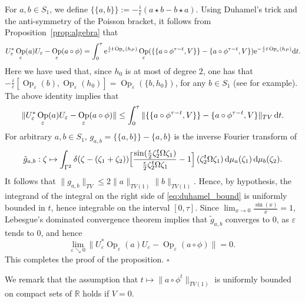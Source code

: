 \documentclass[11pt]{article}
\DeclareMathOperator{\Op}{Op}
\renewcommand{\d}{{\rm d}}
\newcommand{\e}{{\rm e}}
\begin{document}
	For $a,b\in S_1$, we define $\{\{a,b\}\}:=-\frac i\epsilon (a\star b-b\star a)$. Using Duhamel's trick and the 
	anti-symmetry of the Poisson bracket, it follows from Proposition~\ref{prop:algebra} that
	$$U_{\varepsilon}^*\Op_\varepsilon(a)U_\varepsilon - \Op_\varepsilon(a\circ\phi)=
	\int_0^{\tau} \e^{\frac{i}{\varepsilon}t\Op_\varepsilon(h_P)}\Op_\varepsilon(\{\{a\circ\phi^{\tau-t},V\}\} 
	-\{a\circ\phi^{\tau-t},V\})\e^{-\frac i\varepsilon t\Op_\varepsilon(h_P)} \d t.$$
	Here we have used that, since $h_0$ is at most of degree $2$, one has that $-\frac{i}{\varepsilon}[\Op_{\varepsilon}(b),
	\Op_\varepsilon(h_0)]=\Op_\varepsilon(\{b,h_0\})$, for any $b\in S_1$ (see \cite[Theorem~10.13]{DerGerard} for example).
	The above identity implies that
	\begin{align}\label{eq:duhamel_bound}
		\|U_{\varepsilon}^*\Op_\varepsilon(a)U_\varepsilon - \Op_\varepsilon(a\circ\phi)\|\leq 
		\int_0^{\tau}\|\{\{a\circ\phi^{\tau-t},V\}\} -\{a\circ\phi^{\tau-t},V\}\|_{TV}\,\d t.
	\end{align}
	For arbitrary $a,b\in S_1$, $g_{a,b}=\{\{a,b\}\} -\{a,b\}$ is the inverse Fourier transform of
	$$\tilde g_{a,b}:\zeta\mapsto\int_{\Gamma^2}\delta(\zeta-(\zeta_1+\zeta_2))\Big[\frac{\operatorname{sin}(\tfrac\epsilon 2 \zeta_2^t\Omega \zeta_1)}{\tfrac\epsilon 2 \zeta_2^t\Omega \zeta_1}-1\Big]\,(\zeta_2^t\Omega\zeta_1)\,\d \mu_a(\zeta_1)
	\,\d \mu_b(\zeta_2).$$
	It follows that $\|g_{a,b}\|_{TV}\leq 2\|a\|_{TV(1)}\|b\|_{TV(1)}$. Hence, by hypothesis, the integrand of the integral on
	the right side of \eqref{eq:duhamel_bound} is uniformly bounded in $t$, hence integrable on the interval $[0,\tau]$. 
	Since $\lim_{x\to 0}\frac{\operatorname{sin}(x)}{x}=1$, Lebesgue's dominated convergence theorem implies
	that $\tilde{g}_{a,b}$ converges to $0$, as $\varepsilon$ tends to 0, and hence 
	$$\underset{\varepsilon \searrow 0}{\text{lim}}\, \|U_{\varepsilon}^*\Op_\varepsilon(a)U_\varepsilon - \Op_\varepsilon(a\circ\phi)\| 
	= 0.$$
	This completes the proof of the proposition. \hfill{$\square$}
	
\vspace{0.15cm} We remark that the assumption that $t\mapsto \|a\circ\phi^t\|_{TV(1)}$ is uniformly bounded on compact 
sets of $\mathbb{R}$ holds if $V=0$.
\end{document}
